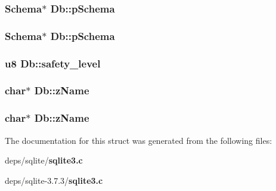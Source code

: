 \subsubsection{\setlength{\rightskip}{0pt plus 5cm}\bf{Schema}$\ast$ \bf{Db::p\-Schema}}\label{structDb_5344a1ae389c985264838ffcb0740e35}


\subsubsection{\setlength{\rightskip}{0pt plus 5cm}\bf{Schema}$\ast$ \bf{Db::p\-Schema}}\label{structDb_5344a1ae389c985264838ffcb0740e35}


\subsubsection{\setlength{\rightskip}{0pt plus 5cm}\bf{u8} \bf{Db::safety\_\-level}}\label{structDb_291046474d880f617b185826419b30e0}


\subsubsection{\setlength{\rightskip}{0pt plus 5cm}char$\ast$ \bf{Db::z\-Name}}\label{structDb_f32ab6db7fddd7ad8edd64fb9fc91e73}


\subsubsection{\setlength{\rightskip}{0pt plus 5cm}char$\ast$ \bf{Db::z\-Name}}\label{structDb_f32ab6db7fddd7ad8edd64fb9fc91e73}




The documentation for this struct was generated from the following files:\begin{CompactItemize}
\item 
deps/sqlite/\bf{sqlite3.c}\item 
deps/sqlite-3.7.3/\bf{sqlite3.c}\end{CompactItemize}
